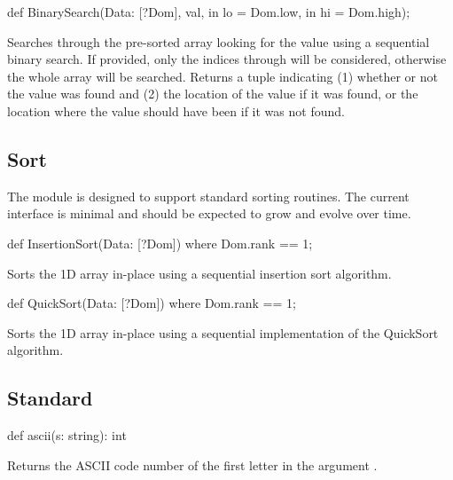 \begin{protohead}
def BinarySearch(Data: [?Dom], val, in lo = Dom.low, in hi = Dom.high);
\end{protohead}
\begin{protobody}
Searches through the pre-sorted array  looking for the
value  using a sequential binary search.  If provided, only
the indices  through  will be considered, otherwise
the whole array will be searched.  Returns a tuple indicating (1)
whether or not the value was found and (2) the location of the value
if it was found, or the location where the value should have been if
it was not found.
\end{protobody}


\subsection{Sort}
\label{Sort}

The  module is designed to support standard sorting
routines.  The current interface is minimal and should be expected to
grow and evolve over time.

\begin{protohead}
def InsertionSort(Data: [?Dom]) where Dom.rank == 1;
\end{protohead}
\begin{protobody}
Sorts the 1D array  in-place using a sequential insertion
sort algorithm.
\end{protobody}

\begin{protohead}
def QuickSort(Data: [?Dom]) where Dom.rank == 1;
\end{protohead}
\begin{protobody}
Sorts the 1D array  in-place using a sequential
implementation of the QuickSort algorithm.
\end{protobody}

\subsection{Standard}
\label{Standard}

\begin{protohead}
def ascii(s: string): int
\end{protohead}
\begin{protobody}
Returns the ASCII code number of the first letter in the
argument .
\end{protobody}

